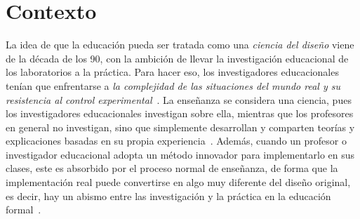 
\section{Contexto}
\label{sec:contexto}











La idea de que la educación pueda ser tratada como una \emph{ciencia del diseño} viene de la década de los 90, con la ambición de llevar la investigación educacional de los laboratorios a la práctica. Para hacer eso, los investigadores educacionales tenían que enfrentarse a \emph{la complejidad de las situaciones del mundo real y su resistencia al control experimental}~\cite{collins2004design}. La enseñanza se considera una ciencia, pues los investigadores educacionales investigan sobre ella, mientras que los profesores en general no investigan, sino que simplemente desarrollan y comparten teorías y explicaciones basadas en su propia experiencia~\cite{laurillard2012teaching}. Además, cuando un profesor o investigador educacional adopta un método innovador para implementarlo en sus clases, este es absorbido por el proceso normal de enseñanza, de forma que la implementación real puede convertirse en algo muy diferente del diseño original, es decir, hay un abismo entre las investigación y la práctica en la educación formal~\cite{anderson2012design}. 

